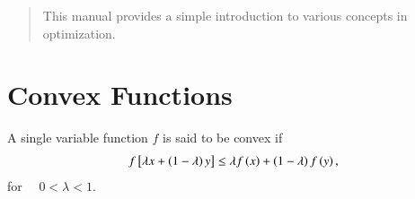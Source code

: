 \documentclass[journal,12pt,twocolumn]{IEEEtran}
\begin{document}
\tableofcontents

\renewcommand{\thefigure}{\theenumi}
\renewcommand{\thetable}{\theenumi}

\begin{abstract}
This manual provides a simple introduction to various concepts in optimization.
\end{abstract}


\fi
\section{Convex Functions}

A single variable function $f$ is said to be convex if
%
\begin{align}
\label{ch1_convex_def}
f\sbrak{\lambda x + \brak{1-\lambda}y} \leq \lambda f\brak{x} + \brak{1-\lambda}f\brak{y}, 
\end{align}
%
for $\quad 0 < \lambda < 1$.
\end{document}
